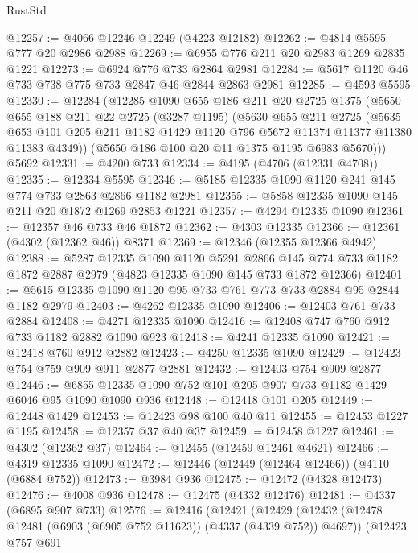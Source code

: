 \begin{lexlean}{RustStd}
\begin{coremodule}
@12257 := @4066 @12246 @12249 (@4223 @12182)
@12262 := @4814 @5595 @777 @20 @2986 @2988
@12269 := @6955 @776 @211 @20 @2983 @1269 @2835 @1221
@12273 := @6924 @776 @733 @2864 @2981
@12284 := @5617 @1120 @46 @733 @738 @775 @733 @2847 @46 @2844 @2863 @2981
@12285 := @4593 @5595
@12330 := @12284
    (@12285
      @1090
      @655
      @186
      @211
      @20
      @2725
      @1375
      (@5650
        @655
        @188
        @211
        @22
        @2725
        (@3287 @1195)
        (@5630
          @655
          @211
          @2725
          (@5635
            @653
            @101
            @205
            @211
            @1182
            @1429
            @1120
            @796
            @5672
            @11374
            @11377
            @11380
            @11383
            @4349))
        (@5650 @186 @100 @20 @11 @1375 @1195 @6983 @5670)))
    @5692
@12331 := @4200 @733
@12334 := @4195 (@4706 (@12331 @4708))
@12335 := @12334 @5595
@12346 := @5185 @12335 @1090 @1120 @241 @145 @774 @733 @2863 @2866 @1182 @2981
@12355 := @5858 @12335 @1090 @145 @211 @20 @1872 @1269 @2853 @1221
@12357 := @4294 @12335 @1090
@12361 := @12357 @46 @733 @46 @1872
@12362 := @4303 @12335
@12366 := @12361 (@4302 (@12362 @46)) @8371
@12369 := @12346 (@12355 @12366 @4942)
@12388 := @5287
    @12335
    @1090
    @1120
    @5291
    @2866
    @145
    @774
    @733
    @1182
    @1872
    @2887
    @2979
    (@4823 @12335 @1090 @145 @733 @1872 @12366)
@12401 := @5615 @12335 @1090 @1120 @95 @733 @761 @773 @733 @2884 @95 @2844 @1182 @2979
@12403 := @4262 @12335 @1090
@12406 := @12403 @761 @733 @2884
@12408 := @4271 @12335 @1090
@12416 := @12408 @747 @760 @912 @733 @1182 @2882 @1090 @923
@12418 := @4241 @12335 @1090
@12421 := @12418 @760 @912 @2882
@12423 := @4250 @12335 @1090
@12429 := @12423 @754 @759 @909 @911 @2877 @2881
@12432 := @12403 @754 @909 @2877
@12446 := @6855 @12335 @1090 @752 @101 @205 @907 @733 @1182 @1429 @6046 @95 @1090 @1090 @936
@12448 := @12418 @101 @205
@12449 := @12448 @1429
@12453 := @12423 @98 @100 @40 @11
@12455 := @12453 @1227 @1195
@12458 := @12357 @37 @40 @37
@12459 := @12458 @1227
@12461 := @4302 (@12362 @37)
@12464 := @12455 (@12459 @12461 @4621)
@12466 := @4319 @12335 @1090
@12472 := @12446 (@12449 (@12464 @12466)) (@4110 (@6884 @752))
@12473 := @3984 @936
@12475 := @12472 (@4328 @12473)
@12476 := @4008 @936
@12478 := @12475 (@4332 @12476)
@12481 := @4337 (@6895 @907 @733)
@12576 := @12416
    (@12421
      (@12429
        (@12432 (@12478 @12481 (@6903 (@6905 @752 @11623)) (@4337 (@4339 @752)) @4697))
        (@12423
          @757
          @691

\end{coremodule}
\end{lexlean}
